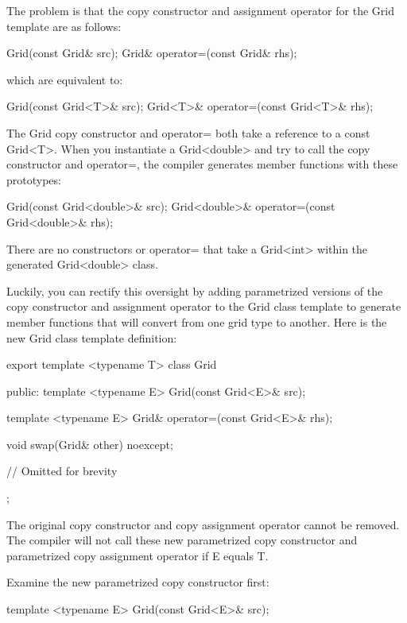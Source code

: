 The problem is that the copy constructor and assignment operator for the Grid template are as follows:

\begin{cpp}
Grid(const Grid& src);
Grid& operator=(const Grid& rhs);
\end{cpp}

which are equivalent to:

\begin{cpp}
Grid(const Grid<T>& src);
Grid<T>& operator=(const Grid<T>& rhs);
\end{cpp}

The Grid copy constructor and operator= both take a reference to a const Grid<T>. When you instantiate a Grid<double> and try to call the copy constructor and operator=, the compiler generates member functions with these prototypes:

\begin{cpp}
Grid(const Grid<double>& src);
Grid<double>& operator=(const Grid<double>& rhs);
\end{cpp}

There are no constructors or operator= that take a Grid<int> within the generated Grid<double> class.

Luckily, you can rectify this oversight by adding parametrized versions of the copy constructor and assignment operator to the Grid class template to generate member functions that will convert from one grid type to another. Here is the new Grid class template definition:

\begin{cpp}
export template <typename T>
class Grid
{
    public:
        template <typename E>
        Grid(const Grid<E>& src);

        template <typename E>
        Grid& operator=(const Grid<E>& rhs);

        void swap(Grid& other) noexcept;

        // Omitted for brevity
};
\end{cpp}

The original copy constructor and copy assignment operator cannot be removed. The compiler will not call these new parametrized copy constructor and parametrized copy assignment operator if E equals T.

Examine the new parametrized copy constructor first:

\begin{cpp}
template <typename E>
Grid(const Grid<E>& src);
\end{cpp}


